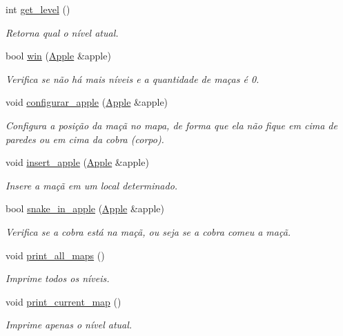 \begin{DoxyCompactItemize}
int \hyperlink{classLevel_a63a8d05dda7cbcfd812e8a99c47415e7}{get\+\_\+level} ()
\begin{DoxyCompactList}\small\item\em Retorna qual o nível atual. \end{DoxyCompactList}\item 
bool \hyperlink{classLevel_a84ae9945f973c39236b08a50b0ec878f}{win} (\hyperlink{classApple}{Apple} \&apple)
\begin{DoxyCompactList}\small\item\em Verifica se não há mais níveis e a quantidade de maças é 0. \end{DoxyCompactList}\item 
void \hyperlink{classLevel_a19bfdf725454de061d80cc23a370677d}{configurar\+\_\+apple} (\hyperlink{classApple}{Apple} \&apple)
\begin{DoxyCompactList}\small\item\em Configura a posição da maçã no mapa, de forma que ela não fique em cima de paredes ou em cima da cobra (corpo). \end{DoxyCompactList}\item 
void \hyperlink{classLevel_a4ee0703973ca3ea41f056ffd775fc95f}{insert\+\_\+apple} (\hyperlink{classApple}{Apple} \&apple)
\begin{DoxyCompactList}\small\item\em Insere a maçã em um local determinado. \end{DoxyCompactList}\item 
bool \hyperlink{classLevel_a6956ffc5e9752ef3510268d839951218}{snake\+\_\+in\+\_\+apple} (\hyperlink{classApple}{Apple} \&apple)
\begin{DoxyCompactList}\small\item\em Verifica se a cobra está na maçã, ou seja se a cobra comeu a maçã. \end{DoxyCompactList}\item 
void \hyperlink{classLevel_a3502a6e0ebca94ed3529dd9bae317823}{print\+\_\+all\+\_\+maps} ()
\begin{DoxyCompactList}\small\item\em Imprime todos os níveis. \end{DoxyCompactList}\item 
void \hyperlink{classLevel_a3b73a93c34030adbfe08794d61ed3840}{print\+\_\+current\+\_\+map} ()
\begin{DoxyCompactList}\small\item\em Imprime apenas o nível atual. \end{DoxyCompactList}\item 

\end{DoxyCompactItemize}
